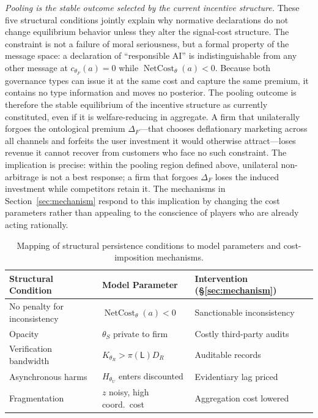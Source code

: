 \documentclass[preprint,authoryear]{elsarticle}
\theoremstyle{definition}
\theoremstyle{plain}
\begin{document}
\emph{Pooling is the stable outcome selected by the current incentive structure.} These five structural conditions jointly explain why normative declarations do not change equilibrium behavior unless they alter the signal-cost structure. The constraint is not a failure of moral seriousness, but a formal property of the message space: a declaration of ``responsible AI'' is indistinguishable from any other message at $c_{\theta_F}(a)=0$ while $\operatorname{NetCost}_{\theta}(a)<0$. Because both governance types can issue it at the same cost and capture the same premium, it contains no type information and moves no posterior. The pooling outcome is therefore the stable equilibrium of the incentive structure as currently constituted, even if it is welfare-reducing in aggregate. A firm that unilaterally forgoes the ontological premium $\Delta_F$---that chooses deflationary marketing across all channels and forfeits the user investment it would otherwise attract---loses revenue it cannot recover from customers who face no such constraint. The implication is precise: within the pooling region defined above, unilateral non-arbitrage is not a best response; a firm that forgoes $\Delta_F$ loses the induced investment while competitors retain it. The mechanisms in Section~\ref{sec:mechanism} respond to this implication by changing the cost parameters rather than appealing to the conscience of players who are already acting rationally.

\begin{table}[ht]
\centering
\small
\setlength{\tabcolsep}{4pt}
\begin{tabular}{@{}lll@{}}
\toprule
\textbf{Structural Condition} & \textbf{Model Parameter} & \textbf{Intervention (\S\ref{sec:mechanism})} \\
\midrule
No penalty for inconsistency & $\operatorname{NetCost}_{\theta}(a)<0$ & Sanctionable inconsistency \\
Opacity & $\theta_S$ private to firm & Costly third-party audits \\
Verification bandwidth & $K_{\theta_R}>\pi(\mathsf{L})D_R$ & Auditable records \\
Asynchronous harms & $H_{\theta_U}$ enters discounted & Evidentiary lag priced \\
Fragmentation & $z$ noisy, high coord.\ cost & Aggregation cost lowered \\
\bottomrule
\end{tabular}
\caption{Mapping of structural persistence conditions to model parameters and cost-imposition mechanisms.}
\label{tab:condition-map}
\end{table}
\end{document}
